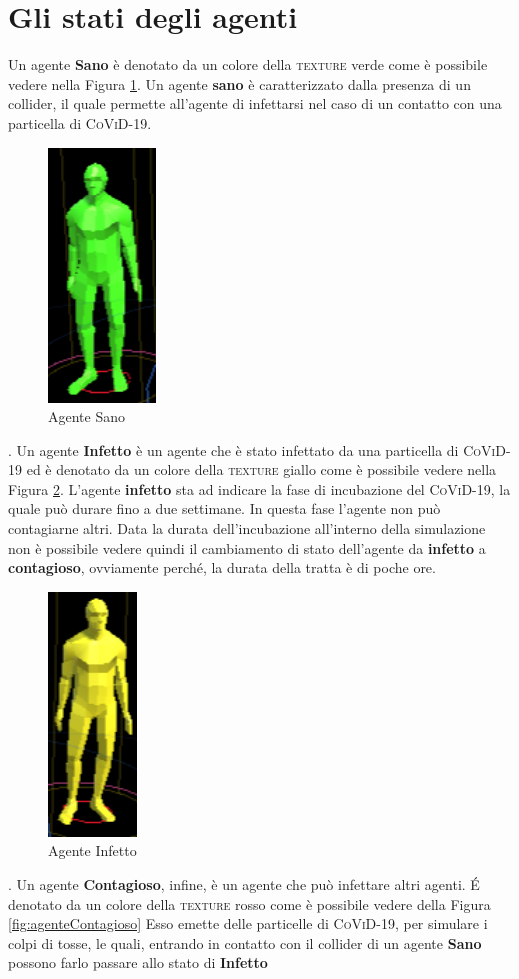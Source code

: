 \documentclass[12pt, openany]{book}
\begin{document}
	\section{Gli stati degli agenti}
	Un agente \textbf{Sano} è denotato da un colore della \textsc{texture} verde come è possibile vedere nella Figura \ref{fig:agenteSano}. Un agente \textbf{sano} è caratterizzato dalla presenza di un collider, il quale permette all'agente di infettarsi nel caso di un contatto con una particella di \textsc{CoViD-19}.	
	\begin{figure}[H]
		\centering
		\includegraphics[width=0.1\linewidth]{"Immagini/AgenteSano.png"}
		\caption{Agente Sano}
		\label{fig:agenteSano}
	\end{figure}.
	Un agente \textbf{Infetto} è un agente che è stato infettato da una particella di \textsc{CoViD-19} ed è denotato da un colore della \textsc{texture} giallo come è possibile vedere nella Figura \ref{fig:agenteInfetto}. L'agente \textbf{infetto} sta ad indicare la fase di incubazione del \textsc{CoViD-19}, la quale può durare fino a due settimane. In questa fase l'agente non può contagiarne altri. Data la durata dell'incubazione all'interno della simulazione non è possibile vedere quindi il cambiamento di stato dell'agente da \textbf{infetto} a \textbf{contagioso}, ovviamente perché, la durata della tratta è di poche ore.	\begin{figure}[H]
		\centering
		\includegraphics[width=0.1\linewidth]{"Immagini/AgenteInfetto.png"}
		\caption{Agente Infetto}
		\label{fig:agenteInfetto}
	\end{figure}.
	Un agente \textbf{Contagioso}, infine, è un agente che può infettare altri agenti. É denotato da un colore della \textsc{texture} rosso come è possibile vedere della Figura \ref{fig:agenteContagioso} Esso emette delle particelle di \textsc{CoViD-19}, per simulare i colpi di tosse, le quali, entrando in contatto con il collider di un agente \textbf{Sano} possono farlo passare allo stato di \textbf{Infetto}	
\end{document}

